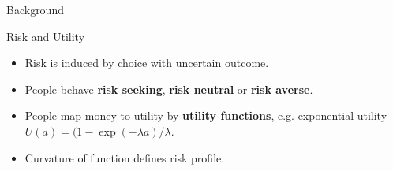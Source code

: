\begin{exampleblock}{Background}

\Large{Risk and Utility}

\normalsize

\begin{itemize}
    \item Risk is induced by choice with uncertain outcome.
    \item People behave \textbf{risk seeking}, \textbf{risk neutral} or \textbf{risk averse}.
    \item People map money to utility by \textbf{utility functions}, e.g. exponential utility $U(a) = (1-\exp(-\lambda a) / \lambda$. 
    \item Curvature of function defines risk profile.
\end{itemize}

\hspace{2cm}


\newlength{\twosubht}
\newsavebox{\twosubbox}


\begin{figure}[htp]


\end{figure}
\end{exampleblock}
